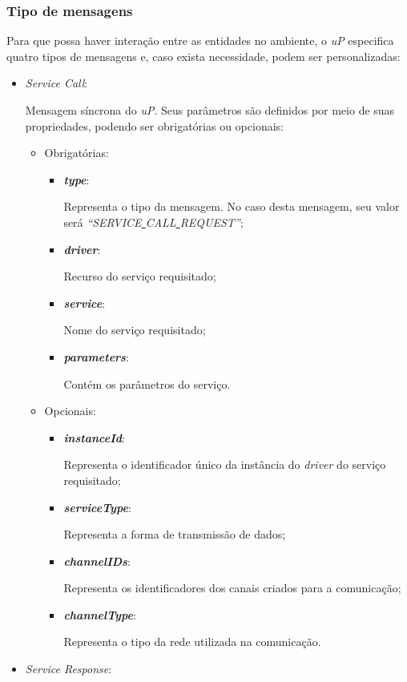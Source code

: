 \subsubsection{Tipo de mensagens}

Para que possa haver interação entre as entidades no ambiente, o \emph{uP} especifica quatro tipos de mensagens e, caso exista necessidade,  podem ser personalizadas:

\begin{itemize}
	\item \emph{Service Call}: 

		Mensagem síncrona do \emph{uP}. Seus parâmetros são definidos por meio de suas propriedades, podendo ser obrigatórias ou opcionais:
		\begin{itemize}
			\item Obrigatórias:
				\begin{itemize}
					\item \emph{\bf{type}}: 

						Representa o tipo da mensagem. No caso desta mensagem, seu valor será \emph{``SERVICE\underline{ }CALL\underline{ }REQUEST''};
					\item \emph{\bf{driver}}: 

						Recurso do serviço requisitado;
					\item \emph{\bf{service}}:

						Nome do serviço requisitado;
					\item \emph{\bf{parameters}}:

						Contém os parâmetros do serviço.
				\end{itemize}
			\item Opcionais:
				\begin{itemize}
					\item \emph{\bf{instanceId}}:

						Representa o identificador único da instância do \emph{driver} do serviço requisitado;
					\item \emph{\bf{serviceType}}:
						
						Representa a forma de transmissão de dados;
					\item \emph{\bf{channelIDs}}:

						Representa os identificadores dos canais criados para a comunicação;
					\item \emph{\bf{channelType}}:

						Representa o tipo da rede utilizada na comunicação.
				\end{itemize}
		\end{itemize}
	\item \emph{Service Response}: 


\end{itemize}

